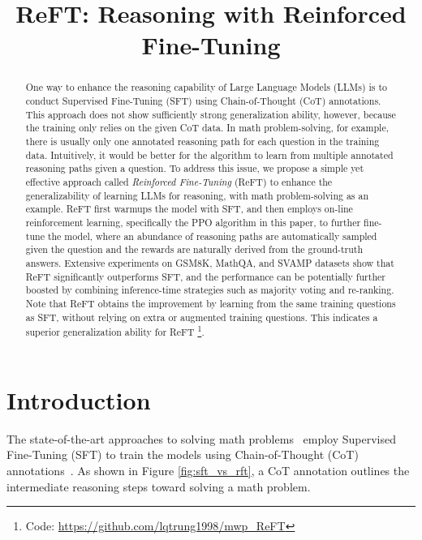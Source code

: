 \title{ReFT: Reasoning with Reinforced Fine-Tuning}



\maketitle

\begin{abstract}
One way to enhance the reasoning capability of Large Language Models (LLMs) is to conduct Supervised Fine-Tuning (SFT) using Chain-of-Thought (CoT) annotations. 
This approach does not show sufficiently strong generalization ability, however, because the training only relies on the given CoT data. 
In math problem-solving, for example, 
there is usually only one annotated reasoning path for each question in the training data. 
Intuitively, it would be better for the algorithm to learn from multiple annotated reasoning paths given a question.
To address this issue,  we propose a simple yet effective approach called \textit{Reinforced Fine-Tuning} (ReFT) to enhance the generalizability of learning LLMs for reasoning, with math problem-solving as an example.  
ReFT first warmups the model with SFT, 
and then employs on-line reinforcement learning, specifically the PPO algorithm in this paper, to further fine-tune the model, 
where an abundance of reasoning paths are automatically sampled given the question and the rewards are naturally derived from the ground-truth answers. 
Extensive experiments on GSM8K, MathQA, and SVAMP datasets show that ReFT significantly outperforms SFT,
and the performance can be potentially further boosted by combining inference-time strategies such as majority voting and re-ranking. 
Note that ReFT obtains the improvement by learning from the same training questions as SFT, 
without relying on extra or augmented training questions.
This indicates a superior generalization ability for ReFT
\footnote{Code: \url{https://github.com/lqtrung1998/mwp_ReFT}}.
\end{abstract}

\section{Introduction}
The state-of-the-art approaches to solving math problems~\cite{luo2023wizardmath,wang2023mathcoder} employ Supervised Fine-Tuning (SFT) to train the models using Chain-of-Thought (CoT) annotations~\cite{wei2022chain}. As shown in Figure \ref{fig:sft_vs_rft}, a CoT annotation outlines the intermediate reasoning steps toward solving a math problem. 

